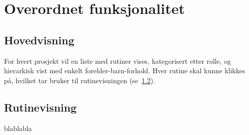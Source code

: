 \section{Overordnet funksjonalitet}
	\label{sec:overordnet}
	
	\subsection{Hovedvisning}
		\label{ssec:hovedvisning}

		For hvert prosjekt vil en liste med rutiner vises, kategorisert etter rolle, og hierarkisk vist med enkelt forelder-barn-forhold. Hver rutine skal kunne klikkes på, hvilket tar bruker til rutinevisningen (se~\ref{ssec:rutinevisning}).

	\subsection{Rutinevisning}
		\label{ssec:rutinevisning}

		blablabla

	
